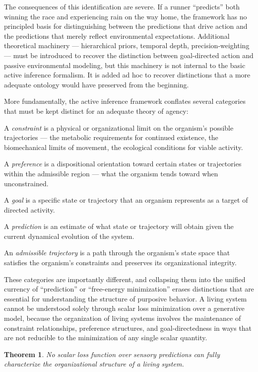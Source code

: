 \documentclass[12pt,a4paper]{report}
\theoremstyle{flyxion}
\newtheorem{theorem}{Theorem}[chapter]
\begin{document}
The consequences of this identification are severe. If a runner ``predicts'' both winning the race and experiencing rain on the way home, the framework has no principled basis for distinguishing between the predictions that drive action and the predictions that merely reflect environmental expectations. Additional theoretical machinery --- hierarchical priors, temporal depth, precision-weighting --- must be introduced to recover the distinction between goal-directed action and passive environmental modeling, but this machinery is not internal to the basic active inference formalism. It is added ad hoc to recover distinctions that a more adequate ontology would have preserved from the beginning.

More fundamentally, the active inference framework conflates several categories that must be kept distinct for an adequate theory of agency:

A \emph{constraint} is a physical or organizational limit on the organism's possible trajectories --- the metabolic requirements for continued existence, the biomechanical limits of movement, the ecological conditions for viable activity.

A \emph{preference} is a dispositional orientation toward certain states or trajectories within the admissible region --- what the organism tends toward when unconstrained.

A \emph{goal} is a specific state or trajectory that an organism represents as a target of directed activity.

A \emph{prediction} is an estimate of what state or trajectory will obtain given the current dynamical evolution of the system.

An \emph{admissible trajectory} is a path through the organism's state space that satisfies the organism's constraints and preserves its organizational integrity.

These categories are importantly different, and collapsing them into the unified currency of ``prediction'' or ``free-energy minimization'' erases distinctions that are essential for understanding the structure of purposive behavior. A living system cannot be understood solely through scalar loss minimization over a generative model, because the organization of living systems involves the maintenance of constraint relationships, preference structures, and goal-directedness in ways that are not reducible to the minimization of any single scalar quantity.

\begin{theorem}
No scalar loss function over sensory predictions can fully characterize the organizational structure of a living system.
\end{theorem}
\end{document}
